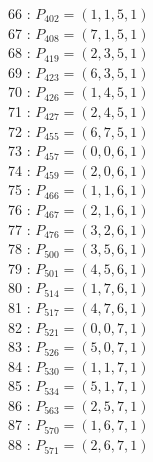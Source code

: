 \documentclass{article}
\begin{document}
{\begin{multicols}{3}
66 : $P_{402}=( 1, 1, 5, 1 )$\\
67 : $P_{408}=( 7, 1, 5, 1 )$\\
68 : $P_{419}=( 2, 3, 5, 1 )$\\
69 : $P_{423}=( 6, 3, 5, 1 )$\\
70 : $P_{426}=( 1, 4, 5, 1 )$\\
71 : $P_{427}=( 2, 4, 5, 1 )$\\
72 : $P_{455}=( 6, 7, 5, 1 )$\\
73 : $P_{457}=( 0, 0, 6, 1 )$\\
74 : $P_{459}=( 2, 0, 6, 1 )$\\
75 : $P_{466}=( 1, 1, 6, 1 )$\\
76 : $P_{467}=( 2, 1, 6, 1 )$\\
77 : $P_{476}=( 3, 2, 6, 1 )$\\
78 : $P_{500}=( 3, 5, 6, 1 )$\\
79 : $P_{501}=( 4, 5, 6, 1 )$\\
80 : $P_{514}=( 1, 7, 6, 1 )$\\
81 : $P_{517}=( 4, 7, 6, 1 )$\\
82 : $P_{521}=( 0, 0, 7, 1 )$\\
83 : $P_{526}=( 5, 0, 7, 1 )$\\
84 : $P_{530}=( 1, 1, 7, 1 )$\\
85 : $P_{534}=( 5, 1, 7, 1 )$\\
86 : $P_{563}=( 2, 5, 7, 1 )$\\
87 : $P_{570}=( 1, 6, 7, 1 )$\\
88 : $P_{571}=( 2, 6, 7, 1 )$\\
\end{multicols}


%


%


}%
\end{document}
